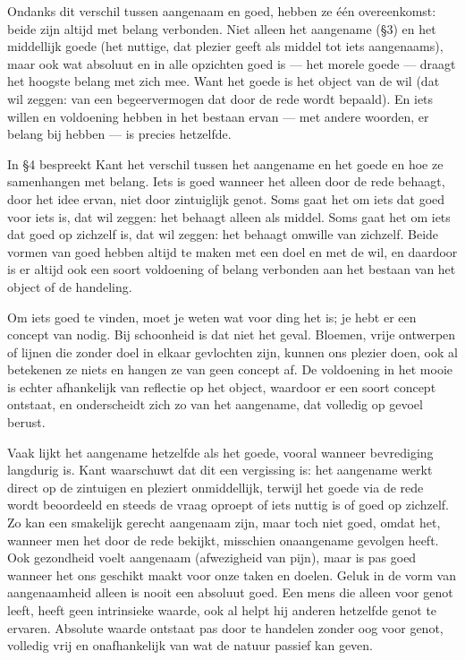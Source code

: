 Ondanks dit verschil tussen aangenaam en goed, hebben ze één overeenkomst: beide zijn altijd met belang verbonden. 
Niet alleen het aangename (§3) en het middellijk goede (het nuttige, dat plezier geeft als middel tot iets aangenaams), maar ook wat absoluut en in alle opzichten goed is --- het morele goede --- draagt het hoogste belang met zich mee. 
Want het goede is het object van de wil (dat wil zeggen: van een begeervermogen dat door de rede wordt bepaald). 
En iets willen en voldoening hebben in het bestaan ervan --- met andere woorden, er belang bij hebben --- is precies hetzelfde.

\begin{mdframed}[leftmargin=0pt,rightmargin=0pt,backgroundcolor=blue!6,linecolor=white,innertopmargin=6pt,innerbottommargin=6pt]

In §4 bespreekt Kant het verschil tussen het aangename en het goede en hoe ze samenhangen met belang. Iets is goed wanneer het alleen door de rede behaagt, door het idee ervan, niet door zintuiglijk genot. Soms gaat het om iets dat goed voor iets is, dat wil zeggen: het behaagt alleen als middel. Soms gaat het om iets dat goed op zichzelf is, dat wil zeggen: het behaagt omwille van zichzelf. Beide vormen van goed hebben altijd te maken met een doel en met de wil, en daardoor is er altijd ook een soort voldoening of belang verbonden aan het bestaan van het object of de handeling.

Om iets goed te vinden, moet je weten wat voor ding het is; je hebt er een concept van nodig. Bij schoonheid is dat niet het geval. Bloemen, vrije ontwerpen of lijnen die zonder doel in elkaar gevlochten zijn, kunnen ons plezier doen, ook al betekenen ze niets en hangen ze van geen concept af. De voldoening in het mooie is echter afhankelijk van reflectie op het object, waardoor er een soort concept ontstaat, en onderscheidt zich zo van het aangename, dat volledig op gevoel berust.

Vaak lijkt het aangename hetzelfde als het goede, vooral wanneer bevrediging langdurig is. Kant waarschuwt dat dit een vergissing is: het aangename werkt direct op de zintuigen en pleziert onmiddellijk, terwijl het goede via de rede wordt beoordeeld en steeds de vraag oproept of iets nuttig is of goed op zichzelf. Zo kan een smakelijk gerecht aangenaam zijn, maar toch niet goed, omdat het, wanneer men het door de rede bekijkt, misschien onaangename gevolgen heeft. Ook gezondheid voelt aangenaam (afwezigheid van pijn), maar is pas goed wanneer het ons geschikt maakt voor onze taken en doelen. Geluk in de vorm van aangenaamheid alleen is nooit een absoluut goed. Een mens die alleen voor genot leeft, heeft geen intrinsieke waarde, ook al helpt hij anderen hetzelfde genot te ervaren. Absolute waarde ontstaat pas door te handelen zonder oog voor genot, volledig vrij en onafhankelijk van wat de natuur passief kan geven.


\end{mdframed}
